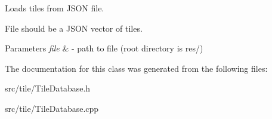 Loads tiles from J\-S\-O\-N file. 

File should be a J\-S\-O\-N vector of tiles. 
\begin{DoxyParams}{Parameters}
{\em file} & -\/ path to file (root directory is res/) \\
\hline
\end{DoxyParams}


The documentation for this class was generated from the following files\-:\begin{DoxyCompactItemize}
\item 
src/tile/Tile\-Database.\-h\item 
src/tile/Tile\-Database.\-cpp\end{DoxyCompactItemize}
